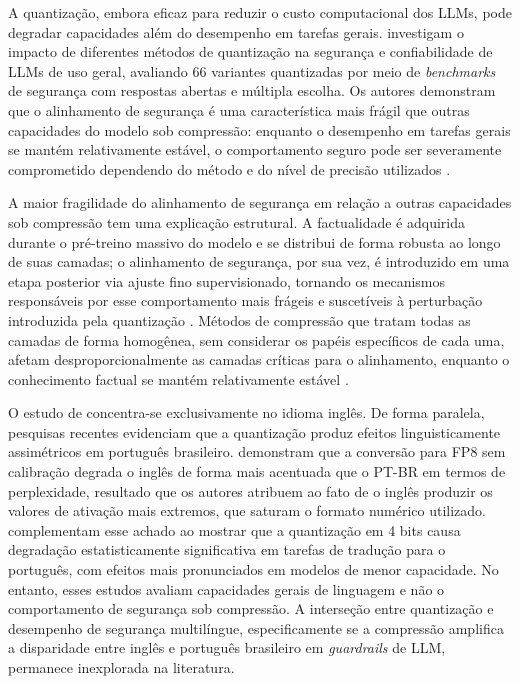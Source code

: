 A quantização, embora eficaz para reduzir o custo computacional dos LLMs, pode degradar capacidades além do desempenho em tarefas gerais.  investigam o impacto de diferentes métodos de quantização na segurança e confiabilidade de LLMs de uso geral, avaliando 66 variantes quantizadas por meio de \textit{benchmarks} de segurança com respostas abertas e múltipla escolha. Os autores demonstram que o alinhamento de segurança é uma característica mais frágil que outras capacidades do modelo sob compressão: enquanto o desempenho em tarefas gerais se mantém relativamente estável, o comportamento seguro pode ser severamente comprometido dependendo do método e do nível de precisão utilizados \cite{kharinaev2025quantization}.

A maior fragilidade do alinhamento de segurança em relação a outras capacidades sob compressão tem uma explicação estrutural. A factualidade é adquirida durante o pré-treino massivo do modelo e se distribui de forma robusta ao longo de suas camadas; o alinhamento de segurança, por sua vez, é introduzido em uma etapa posterior via ajuste fino supervisionado, tornando os mecanismos responsáveis por esse comportamento mais frágeis e suscetíveis à perturbação introduzida pela quantização \cite{kharinaev2025quantization}. Métodos de compressão que tratam todas as camadas de forma homogênea, sem considerar os papéis específicos de cada uma, afetam desproporcionalmente as camadas críticas para o alinhamento, enquanto o conhecimento factual se mantém relativamente estável \cite{kharinaev2025quantization}.

O estudo de  concentra-se exclusivamente no idioma inglês. De forma paralela, pesquisas recentes evidenciam que a quantização produz efeitos linguisticamente assimétricos em português brasileiro.  demonstram que a conversão para FP8 sem calibração degrada o inglês de forma mais acentuada que o PT-BR em termos de perplexidade, resultado que os autores atribuem ao fato de o inglês produzir os valores de ativação mais extremos, que saturam o formato numérico utilizado.  complementam esse achado ao mostrar que a quantização em 4 bits causa degradação estatisticamente significativa em tarefas de tradução para o português, com efeitos mais pronunciados em modelos de menor capacidade. No entanto, esses estudos avaliam capacidades gerais de linguagem e não o comportamento de segurança sob compressão. A interseção entre quantização e desempenho de segurança multilíngue, especificamente se a compressão amplifica a disparidade entre inglês e português brasileiro em \textit{guardrails} de LLM, permanece inexplorada na literatura.
